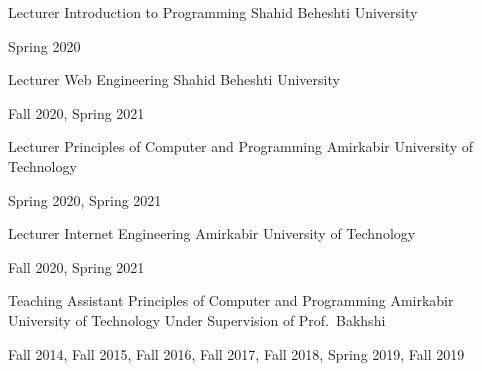 

\begin{cventries}

  \cventry%
    {Lecturer} %
    {Introduction to Programming} %
    {Shahid Beheshti University} %
    {} %
    {%
      \begin{cvitems} %
        Spring 2020
      \end{cvitems}
    }

  \cventry%
    {Lecturer} %
    {Web Engineering} %
    {Shahid Beheshti University} %
    {} %
    {%
      \begin{cvitems} %
        Fall 2020, Spring 2021
      \end{cvitems}
    }

  \cventry%
    {Lecturer} %
    {Principles of Computer and Programming} %
    {Amirkabir University of Technology} %
    {} %
    {%
      \begin{cvitems} %
        Spring 2020, Spring 2021
      \end{cvitems}
    }

  \cventry%
    {Lecturer} %
    {Internet Engineering} %
    {Amirkabir University of Technology} %
    {} %
    {%
      \begin{cvitems} %
        Fall 2020, Spring 2021
      \end{cvitems}
    }

  \cventry%
    {Teaching Assistant} %
    {Principles of Computer and Programming} %
    {Amirkabir University of Technology} %
    {Under Supervision of Prof.\ Bakhshi} %
    {%
      \begin{cvitems} %
        Fall 2014, Fall 2015, Fall 2016, Fall 2017, Fall 2018, Spring 2019, Fall 2019
      \end{cvitems}
    }


\end{cventries}
